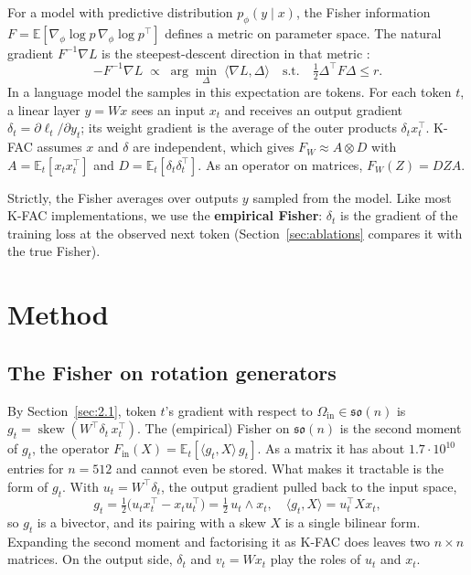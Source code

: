 \documentclass{article}
\begin{document}
For a model with predictive distribution \(p_\phi(y \mid x)\), the Fisher information
\(F = \mathbb{E}[\nabla_\phi \log p\, \nabla_\phi \log p^\top]\) defines a metric on parameter space. The
natural gradient \(F^{-1}\nabla L\) is the steepest-descent direction in that metric \citep{amari1998natural}:
\[-F^{-1}\nabla L \;\propto\; \arg\min_{\Delta}\; \langle \nabla L, \Delta\rangle
\quad \text{s.t.} \quad \tfrac12 \Delta^\top F \Delta \le r .\]
In a language model the samples in this expectation are tokens. For each token \(t\), a linear layer
\(y = Wx\) sees an input \(x_t\) and receives an output gradient \(\delta_t = \partial \ell_t / \partial y_t\); its
weight gradient is the average of the outer products \(\delta_t x_t^\top\). K-FAC \citep{martens2015kfac} assumes \(x\) and \(\delta\) are independent, which gives
\(F_W \approx A \otimes D\) with \(A = \mathbb{E}_t[x_t x_t^\top]\) and \(D = \mathbb{E}_t[\delta_t\delta_t^\top]\).
As an operator on matrices, \(F_W(Z) = D Z A\).

Strictly, the Fisher averages over outputs \(y\) sampled from the model. Like most K-FAC
implementations, we use the \textbf{empirical Fisher}: \(\delta_t\) is the gradient of the training loss at
the observed next token (Section~\ref{sec:ablations} compares it with the true Fisher).

\section{Method}\label{sec:3}

\subsection{The Fisher on rotation generators}\label{sec:fisher}

By Section~\ref{sec:2.1}, token \(t\)'s gradient with respect to \(\Omega_{\mathrm{in}} \in \mathfrak{so}(n)\) is
\(g_t = \operatorname{skew}(W^\top \delta_t\, x_t^\top)\). The (empirical) Fisher on \(\mathfrak{so}(n)\) is the second moment of
\(g_t\), the operator \(F_{\mathrm{in}}(X) = \mathbb{E}_t[\langle g_t, X\rangle\, g_t]\). As a matrix it has about
\(1.7\cdot10^{10}\) entries for \(n = 512\) and cannot even be stored. What makes it tractable is the form of \(g_t\).
With \(u_t = W^\top \delta_t\), the output gradient pulled back to the input space,
\[g_t = \tfrac12\big(u_t x_t^\top - x_t u_t^\top\big) = \tfrac12\, u_t \wedge x_t, \quad \langle g_t, X\rangle = u_t^\top X x_t,\]
so \(g_t\) is a bivector, and its pairing with a skew \(X\) is a single bilinear form. Expanding the second moment and
factorising it as K-FAC does leaves two \(n \times n\) matrices. On the output side, \(\delta_t\) and \(v_t = W x_t\) play the
roles of \(u_t\) and \(x_t\).
\end{document}
